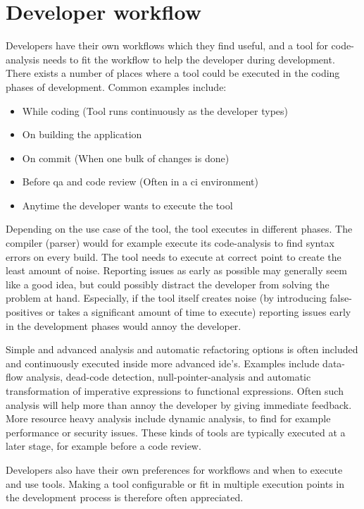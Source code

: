 \documentclass{report}
\begin{document}
\section{Developer workflow}

Developers have their own workflows which they find useful, and a tool for code-analysis needs to fit the workflow to help the developer during development. There exists a number of places where a tool could be executed in the coding phases of development. Common examples include:
\begin{itemize}
    \item While coding (Tool runs continuously as the developer types)
    \item On building the application 
    \item On commit (When one bulk of changes is done)
    \item Before \gls{qa} and code review (Often in a \gls{ci} environment)
    \item Anytime the developer wants to execute the tool
\end{itemize}

Depending on the use case of the tool, the tool executes in different phases. The compiler (parser) would for example execute its code-analysis to find syntax errors on every build. The tool needs to execute at correct point to create the least amount of noise. Reporting issues as early as possible may generally seem like a good idea, but could possibly distract the developer from solving the problem at hand. Especially, if the tool itself creates noise (by introducing false-positives or takes a significant amount of time to execute) reporting issues early in the development phases would annoy the developer. 

Simple and advanced analysis and automatic refactoring options is often included and continuously executed inside more advanced \gls{ide}'s. Examples include data-flow analysis, dead-code detection, null-pointer-analysis and automatic transformation of imperative expressions to functional expressions. Often such analysis will help more than annoy the developer by giving immediate feedback. More resource heavy analysis include dynamic analysis, to find for example performance or security issues. These kinds of tools are typically executed at a later stage, for example before a code review. 

Developers also have their own preferences for workflows and when to execute and use tools. Making a tool configurable or fit in multiple execution points in the development process is therefore often appreciated.
\end{document}
